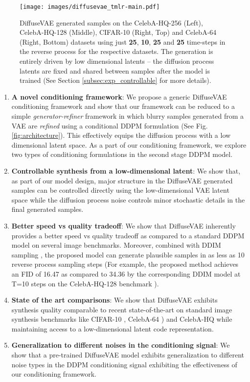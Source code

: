 \documentclass[10pt]{article} \usepackage[accepted]{tmlr}
\begin{document}
\begin{figure*}
  \centering
  \texttt{[image: images/diffusevae\_tmlr-main.pdf]}
    \caption{DiffuseVAE generated samples on the CelebA-HQ-256 (Left), CelebA-HQ-128 (Middle), CIFAR-10 (Right, Top) and CelebA-64 (Right, Bottom) datasets using just \textbf{25}, \textbf{10}, \textbf{25} and \textbf{25} time-steps in the reverse process for the respective datasets. The generation is entirely driven by low dimensional latents -- the diffusion process latents are fixed and shared between samples after the model is trained (See Section \ref{subsec:exp_controllable} for more details).}
    \label{fig:main}
\end{figure*}

\begin{enumerate}
    \item \textbf{A novel conditioning framework}: We propose a generic DiffuseVAE conditioning framework and show that our framework can be reduced to a simple \textit{generator-refiner} framework in which blurry samples generated from a VAE are \textit{refined} using a conditional DDPM formulation (See Fig.\ref{fig:architecture}). This effectively equips the diffusion process with a low dimensional latent space. As a part of our conditioning framework, we explore two types of conditioning formulations in the second stage DDPM model.
    
    \item \textbf{Controllable synthesis from a low-dimensional latent}: We show that, as part of our model design, major structure in the DiffuseVAE generated samples can be controlled directly using the low-dimensional VAE latent space while the diffusion process noise controls minor stochastic details in the final generated samples.
    
    \item \textbf{Better speed vs quality tradeoff}: We show that DiffuseVAE inherently provides a better speed vs quality tradeoff as compared to a standard DDPM model on several image benchmarks. Moreover, combined with DDIM sampling \citep{song2021denoising}, the proposed model can generate plausible samples in as less as 10 reverse process sampling steps (For example, the proposed method achieves an FID \citep{heusel2018gans} of 16.47 as compared to 34.36 by the corresponding DDIM model at T=10 steps on the CelebA-HQ-128 benchmark \citep{karras2018progressive}).
    
    \item \textbf{State of the art comparisons}: We show that DiffuseVAE exhibits synthesis quality comparable to recent state-of-the-art on standard image synthesis benchmarks like CIFAR-10 \citep{krizhevsky2009learning}, CelebA-64 \citep{liu2015faceattributes}) and CelebA-HQ \citep{karras2018progressive} while maintaining access to a low-dimensional latent code representation.


    \item \textbf{Generalization to different noises in the conditioning signal}: We show that a pre-trained DiffuseVAE model exhibits generalization to different noise types in the DDPM conditioning signal exhibiting the effectiveness of our conditioning framework.
\end{enumerate}
\end{document}

